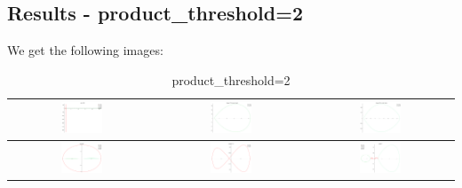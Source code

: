 \documentclass[a4paper,10pt]{article}
\begin{document}
 \subsection{Results - product\_threshold=2}
 We get the following images:
 \begin{table}[!ht]
 \caption{product\_threshold=2}
 \begin{tabular}{|c|c|c|}
  \hline
  \includegraphics[width=0.3\textwidth]{PT_2_z1.png} &
  \includegraphics[width=0.3\textwidth]{PT_2_C1z1.png} &
  \includegraphics[width=0.3\textwidth]{PT_2_C2z1.png} \\ \hline
  \includegraphics[width=0.3\textwidth]{PT_2_z2.png} &
  \includegraphics[width=0.3\textwidth]{PT_2_zed_C0.png} &
  \includegraphics[width=0.3\textwidth]{PT_2_zed.png} \\ \hline
 \end{tabular}
 \end{table}
\end{document}
